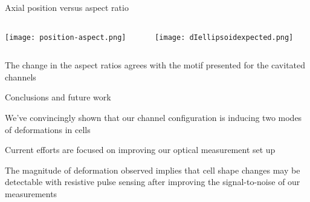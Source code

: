 \begin{frame}[c]{Axial position versus aspect ratio}
	
	\begin{columns}[t]
	 
	\begin{column}[T]{2.25in}
		{\centering
			\texttt{[image: position-aspect.png]} \\
			\par
		}
	\end{column}
	
	
	\begin{column}[T]{2.25in}
		{\centering
			\texttt{[image: dIellipsoidexpected.png]} \\
			\par
		}
	\end{column}
	
	
	
	\end{columns}
	
	
	The change in the aspect ratios agrees with the motif presented for the cavitated channels \\
	
	

	
\end{frame}



\begin{frame}[c]{Conclusions and future work}
	
	We've convincingly shown that our channel configuration is inducing two modes of deformations in cells \\
	
	\vspace{.2in}
	
	Current efforts are focused on improving our optical measurement set up \\
	
	\vspace{.2in}
	
	The magnitude of deformation observed implies that cell shape changes may be detectable with resistive pulse sensing after improving the signal-to-noise of our measurements \\
	

	
\end{frame}





